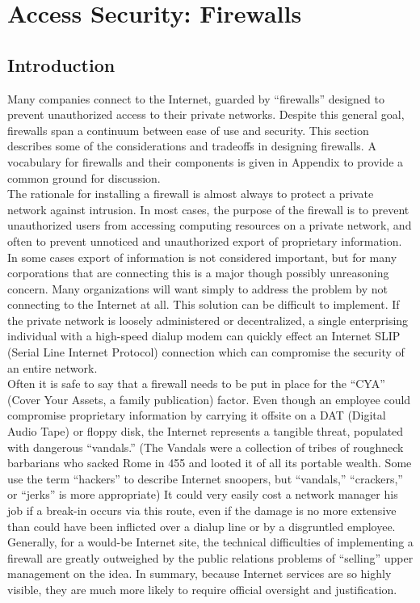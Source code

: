 \section{Access Security: Firewalls}

\subsection{Introduction}
Many companies connect to the Internet, guarded by ``firewalls''
designed to prevent unauthorized access to their private networks.
Despite this general goal, firewalls span a continuum between ease of
use and security. This section describes some of the considerations and
tradeoffs in designing firewalls. A vocabulary for firewalls and their
components is given in Appendix to provide a common ground for
discussion.\\

The rationale for installing a firewall is almost always to protect a
private network against intrusion. In most cases, the purpose of the
firewall is to prevent unauthorized users from accessing computing
resources on a private network, and often to prevent unnoticed and
unauthorized export of proprietary information. In some cases export of
information is not considered important, but for many corporations that
are connecting this is a major though possibly unreasoning concern.
Many organizations will want simply to address the problem by not
connecting to the Internet at all. This solution can be difficult to
implement. If the private network is loosely administered or
decentralized, a single enterprising individual with a high-speed
dialup modem can quickly effect an Internet SLIP (Serial Line Internet
Protocol) connection which can compromise the security of an entire
network.\\

Often it is safe to say that a firewall needs to be put in place for
the ``CYA'' (Cover Your Assets, a family publication) factor. Even
though an employee could compromise proprietary information by carrying
it offsite on a DAT (Digital Audio Tape) or floppy disk, the Internet
represents a tangible threat, populated with dangerous ``vandals.''
(The Vandals were a collection of tribes of roughneck barbarians who
sacked Rome in 455 and looted it of all its portable wealth. Some use
the term ``hackers'' to describe Internet snoopers, but ``vandals,''
``crackers,'' or ``jerks'' is more appropriate) It could very easily
cost a network manager his job if a break-in occurs via this route,
even if the damage is no more extensive than could have been inflicted
over a dialup line or by a disgruntled employee. Generally, for a
would-be Internet site, the technical difficulties of implementing a
firewall are greatly outweighed by the public relations problems of
``selling'' upper management on the idea. In summary, because Internet
services are so highly visible, they are much more likely to require
official oversight and justification.


